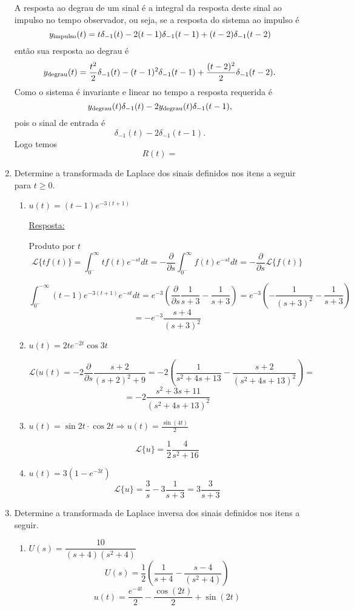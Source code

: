 \documentclass[a4paper, 12pt]{article}
\begin{document}
\begin{enumerate}
 A resposta ao degrau de um sinal é a integral da resposta deste sinal ao impulso no tempo
observador, ou seja, se a resposta do sistema ao impulso é
 \[y_{\rm impulso}(t) = t\delta_{-1}(t)-2(t-1)\delta_{-1}(t-1)+(t-2)\delta_{-1}(t-2)\]
 então sua resposta ao degrau é
 \[y_{\rm degrau}(t) = \frac{t^2}{2}\delta_{-1}(t)-(t-1)^2\delta_{-1}(t-1)+\frac{(t-2)^2}{2}\delta_{-1}(t-2).\] 
 Como o sistema é invariante e linear no tempo a resposta requerida é
 \[y_{\rm degrau}(t)\delta_{-1}(t)-2y_{\rm degrau}(t)\delta_{-1}(t-1),\]
 pois o sinal de entrada é 
 \[\delta_{-1}(t)-2\delta_{-1}(t-1).\]
 Logo temos
 \[R(t) = \]

\item Determine a transformada de Laplace dos sinais definidos nos itens a seguir para $t \geq 0$.
\begin{enumerate}
\item $u(t) = (t-1)e^{-3(t+1)}$

\underline{Resposta:}

 Produto por $t$
 \[\mathcal{L} \{tf(t)\} = \int_{0^-}^{\infty} tf(t)e^{-st} dt = -\frac{\partial }{\partial s}
\int_{0^-}^\infty f(t)e^{-st} dt = -\frac{\partial }{\partial s}\mathcal{L} \{f(t)\}\]


 \[\int^{-\infty}_{0^-} (t-1)e^{-3(t+1)}e^{-st}dt = e^{-3}\left(\frac{\partial }{\partial
s}\frac{1}{s+3}-\frac{1}{s+3}\right) = e^{-3} \left(-\frac{1}{(s+3)^2}-\frac{1}{s+3}\right)\]
\[ = -e^{-3}\frac{s+4}{(s+3)^2}\]
\item $u(t) = 2te^{-2t}\cos 3t$

\[\mathcal{L}(u(t) = -2\frac{\partial}{\partial s}\frac{s+2}{(s+2)^2+9} =
-2\left(\frac{1}{s^2+4s+13}-\frac{s+2}{(s^2+4s+13)^2}\right)=\]
\[=-2\frac{s^2+3s+11}{(s^2+4s+13)^2}\]

\item $u(t) = \sin 2t \cdot \cos 2t \Rightarrow u(t) = \frac{\sin(4t)}{2}$

\[\mathcal{L}\{u\} = \frac{1}{2}\frac{4}{s^2+16}\]

\item $u(t) = 3(1-e^{-3t})$
\[\mathcal{L}\{u\} = \frac{3}{s}-3\frac{1}{s+3} = 3\frac{3}{s+3}\]

\end{enumerate}
\item Determine a transformada de Laplace inversa dos sinais definidos nos itens a seguir.
\begin{enumerate}
\item $U(s)  = \dfrac{10}{(s+4)(s^2+4)}$
 \[U(s) = \frac{1}{2}\left(\frac{1}{s+4}-\frac{s-4}{(s^2+4)}\right)\]
\[u(t) = \frac{e^{-4t}}{2}-\frac{\cos(2t)}{2}+\sin(2t)\]


\end{enumerate}
\end{enumerate}
\end{document}
